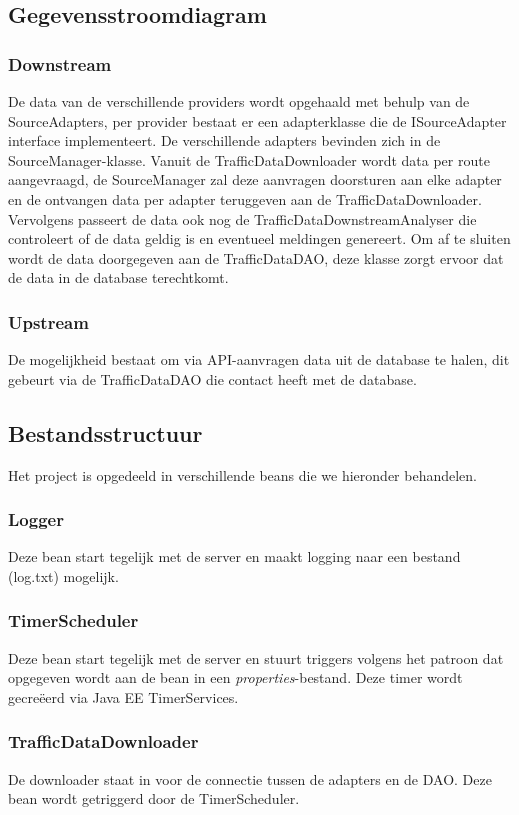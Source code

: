 \documentclass[ps,a4paper,oneside]{report}
\begin{document}
\subsection{Gegevensstroomdiagram}
\subsubsection{Downstream}
De data van de verschillende providers wordt opgehaald met behulp van de SourceAdapters, per provider bestaat er een adapterklasse die de ISourceAdapter interface implementeert. De verschillende adapters bevinden zich in de \\SourceManager-klasse. Vanuit de TrafficDataDownloader wordt data per route aangevraagd, de SourceManager zal deze aanvragen doorsturen aan elke adapter en de ontvangen data per adapter teruggeven aan de TrafficDataDownloader. Vervolgens passeert de data ook nog de TrafficDataDownstreamAnalyser die controleert of de data geldig is en eventueel meldingen genereert. Om af te sluiten wordt de data doorgegeven aan de TrafficDataDAO, deze klasse zorgt ervoor dat de data in de database terechtkomt. 
\subsubsection{Upstream}
De mogelijkheid bestaat om via API-aanvragen data uit de database te halen, dit gebeurt via de TrafficDataDAO die contact heeft met de database.
\subsection{Bestandsstructuur}
Het project is opgedeeld in verschillende beans die we hieronder behandelen.
\subsubsection{Logger}
Deze bean start tegelijk met de server en maakt logging naar een bestand (log.txt) mogelijk.
\subsubsection{TimerScheduler}
Deze bean start tegelijk met de server en stuurt triggers volgens het patroon dat opgegeven wordt aan de bean in een \textit{properties}-bestand. Deze timer wordt gecre\"eerd via Java EE TimerServices.
\subsubsection{TrafficDataDownloader}
De downloader staat in voor de connectie tussen de adapters en de DAO. Deze bean wordt getriggerd door de TimerScheduler.
\end{document}
